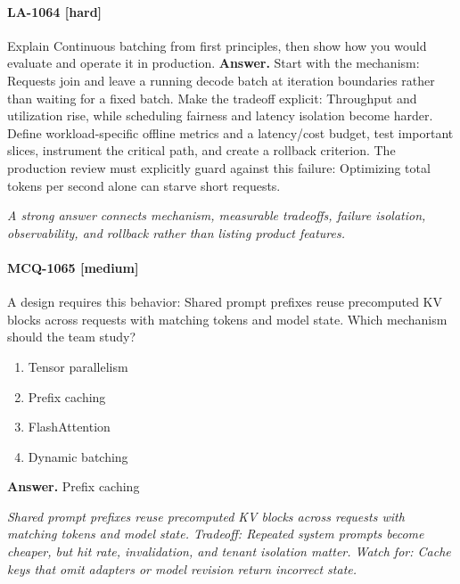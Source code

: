 \paragraph{LA-1064 [hard]} Explain Continuous batching from first principles, then show how you would evaluate and operate it in production.
\noindent\textbf{Answer.} Start with the mechanism: Requests join and leave a running decode batch at iteration boundaries rather than waiting for a fixed batch. Make the tradeoff explicit: Throughput and utilization rise, while scheduling fairness and latency isolation become harder. Define workload-specific offline metrics and a latency/cost budget, test important slices, instrument the critical path, and create a rollback criterion. The production review must explicitly guard against this failure: Optimizing total tokens per second alone can starve short requests.
\par\textit{A strong answer connects mechanism, measurable tradeoffs, failure isolation, observability, and rollback rather than listing product features.}
\paragraph{MCQ-1065 [medium]} A design requires this behavior: Shared prompt prefixes reuse precomputed KV blocks across requests with matching tokens and model state. Which mechanism should the team study?
\begin{enumerate}[label=\Alph*.]
\item Tensor parallelism
\item Prefix caching
\item FlashAttention
\item Dynamic batching
\end{enumerate}
\noindent\textbf{Answer.} Prefix caching
\par\textit{Shared prompt prefixes reuse precomputed KV blocks across requests with matching tokens and model state. Tradeoff: Repeated system prompts become cheaper, but hit rate, invalidation, and tenant isolation matter. Watch for: Cache keys that omit adapters or model revision return incorrect state.}
